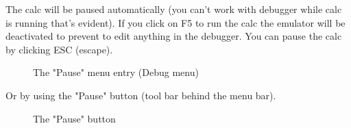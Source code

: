 \documentclass[10pt]{report}
\begin{document}
The calc will be paused automatically (you can't work with debugger while calc is running that's evident).\newline
If you click on F5 to run the calc the emulator will be deactivated to prevent to edit anything in the debugger.\newline
You can pause the calc by clicking ESC (escape).\newline
\begin{figure}[H]
\centering
{}
\caption{The "Pause" menu entry (Debug menu)}
\end{figure}

Or by using the "Pause" button (tool bar behind the menu bar).\newline
\begin{figure}[H]
\centering
{}
\caption{The "Pause" button}
\end{figure}
\end{document}
